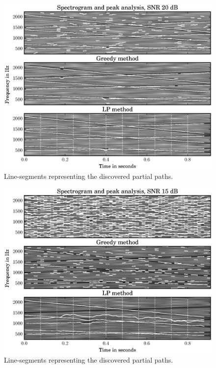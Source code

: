 \begin{figure}[!t]
    \includegraphics[width=\textwidth]{plots/mq_lp_compare_chirp_20.eps}
    \caption{ Line-segments representing the discovered partial paths.
    \label{plot:mq_lp_compare_chirp_20}}
\end{figure}
\begin{figure}[!t]
    \includegraphics[width=\textwidth]{plots/mq_lp_compare_chirp_15.eps}
    \caption{ Line-segments representing the discovered partial paths.
    \label{plot:mq_lp_compare_chirp_15}}
\end{figure}
